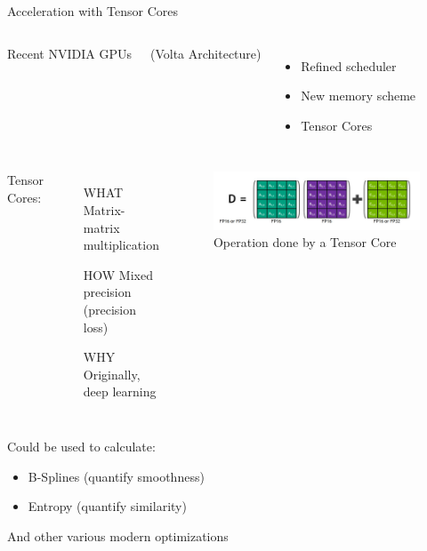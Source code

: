 \begin{frame}{Acceleration with Tensor Cores}
	

		\begin{columns}
			\hfill Recent NVIDIA GPUs
			
			\hfill (Volta Architecture)
			\begin{itemize}
				\item Refined scheduler
				\item New memory scheme
				\item Tensor Cores
			\end{itemize}
		\end{columns} 


	\begin{center}
		\begin{minipage}{0.88\textwidth}
			\begin{columns}
				\column{0.6\linewidth}
				Tensor Cores:
				\begin{itemize}
					\item[WHAT] Matrix-matrix multiplication
					\item[HOW] Mixed precision (precision loss)
					\item[WHY] Originally, deep learning
				\end{itemize}
				\column{0.5\linewidth}
				\begin{figure}
					\includegraphics[width=\textwidth]{tensor_core_op}
					\caption{Operation done by a Tensor Core}
				\end{figure}
			\end{columns}
		\end{minipage}
	
	\begin{minipage}{0.70\textwidth}
	Could be used to calculate:
	
	\begin{itemize}
		\item B-Splines (quantify smoothness)
		\item Entropy (quantify similarity)
	\end{itemize}
	
	And other various modern optimizations
	\end{minipage}
	\end{center}

		
\end{frame}